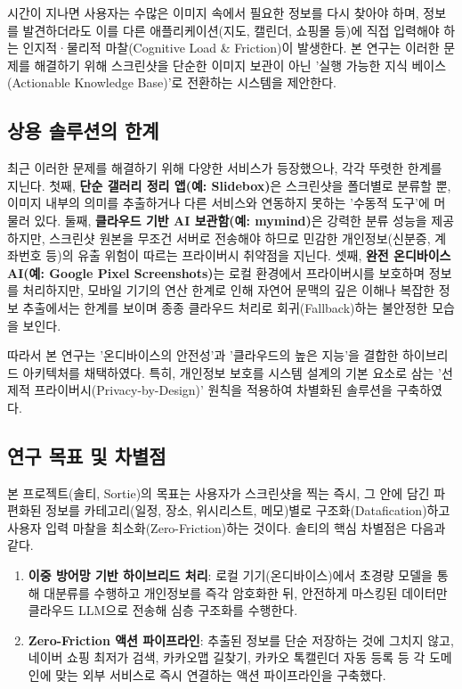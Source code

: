 \documentclass[11pt,a4paper]{article}
\begin{document}
시간이 지나면 사용자는 수많은 이미지 속에서 필요한 정보를 다시 찾아야 하며, 정보를 발견하더라도 이를 다른 애플리케이션(지도, 캘린더, 쇼핑몰 등)에 직접 입력해야 하는 인지적·물리적 마찰(Cognitive Load \& Friction)이 발생한다. 본 연구는 이러한 문제를 해결하기 위해 스크린샷을 단순한 이미지 보관이 아닌 '실행 가능한 지식 베이스(Actionable Knowledge Base)'로 전환하는 시스템을 제안한다.

\subsection{상용 솔루션의 한계}

최근 이러한 문제를 해결하기 위해 다양한 서비스가 등장했으나, 각각 뚜렷한 한계를 지닌다. 
첫째, \textbf{단순 갤러리 정리 앱(예: Slidebox)}은 스크린샷을 폴더별로 분류할 뿐, 이미지 내부의 의미를 추출하거나 다른 서비스와 연동하지 못하는 '수동적 도구'에 머물러 있다. 
둘째, \textbf{클라우드 기반 AI 보관함(예: mymind)}은 강력한 분류 성능을 제공하지만, 스크린샷 원본을 무조건 서버로 전송해야 하므로 민감한 개인정보(신분증, 계좌번호 등)의 유출 위험이 따르는 프라이버시 취약점을 지닌다\cite{ref_privacy_llm}. 
셋째, \textbf{완전 온디바이스 AI(예: Google Pixel Screenshots)}는 로컬 환경에서 프라이버시를 보호하며 정보를 처리하지만, 모바일 기기의 연산 한계로 인해 자연어 문맥의 깊은 이해나 복잡한 정보 추출에서는 한계를 보이며 종종 클라우드 처리로 회귀(Fallback)하는 불안정한 모습을 보인다\cite{ref_ondevice_llm}.

따라서 본 연구는 '온디바이스의 안전성'과 '클라우드의 높은 지능'을 결합한 하이브리드 아키텍처를 채택하였다. 특히, 개인정보 보호를 시스템 설계의 기본 요소로 삼는 '선제적 프라이버시(Privacy-by-Design)' 원칙을 적용하여 차별화된 솔루션을 구축하였다.

\subsection{연구 목표 및 차별점}

본 프로젝트(솔티, Sortie)의 목표는 사용자가 스크린샷을 찍는 즉시, 그 안에 담긴 파편화된 정보를 카테고리(일정, 장소, 위시리스트, 메모)별로 구조화(Datafication)하고 사용자 입력 마찰을 최소화(Zero-Friction)하는 것이다. 솔티의 핵심 차별점은 다음과 같다.

\begin{enumerate}[label=\arabic*)]
    \item \textbf{이중 방어망 기반 하이브리드 처리}: 로컬 기기(온디바이스)에서 초경량 모델을 통해 대분류를 수행하고 개인정보를 즉각 암호화한 뒤, 안전하게 마스킹된 데이터만 클라우드 LLM으로 전송해 심층 구조화를 수행한다.
    \item \textbf{Zero-Friction 액션 파이프라인}: 추출된 정보를 단순 저장하는 것에 그치지 않고, 네이버 쇼핑 최저가 검색, 카카오맵 길찾기, 카카오 톡캘린더 자동 등록 등 각 도메인에 맞는 외부 서비스로 즉시 연결하는 액션 파이프라인을 구축했다.
\end{enumerate}
\end{document}
